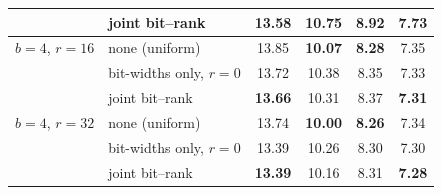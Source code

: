 \begin{table}[H]
\begin{tabular}{llcccc}
 & joint bit--rank & \textbf{13.58} & \textbf{10.75} & 8.92 & \textbf{7.73} \\
\midrule
$b=4$, $r=16$ & none (uniform) & 13.85 & \textbf{10.07} & \textbf{8.28} & 7.35 \\
 & bit-widths only, $r=0$ & 13.72 & 10.38 & 8.35 & 7.33 \\
 & joint bit--rank & \textbf{13.66} & 10.31 & 8.37 & \textbf{7.31} \\
\midrule
$b=4$, $r=32$ & none (uniform) & 13.74 & \textbf{10.00} & \textbf{8.26} & 7.34 \\
 & bit-widths only, $r=0$ & 13.39 & 10.26 & 8.30 & 7.30 \\
 & joint bit--rank & \textbf{13.39} & 10.16 & 8.31 & \textbf{7.28} \\
\bottomrule
\end{tabular}
\end{table}
